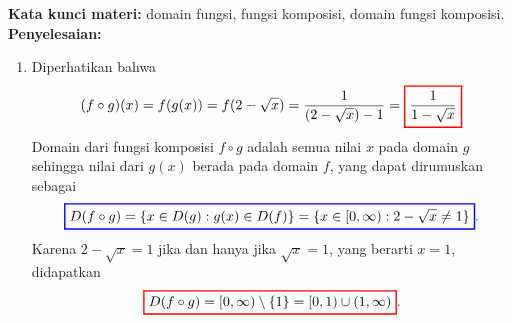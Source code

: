 \documentclass[10pt,openany,a4paper]{article}
\theoremstyle{definition}
\theoremstyle{definition}
\theoremstyle{plain}
\newenvironment{jawab}[2][tes]{%
\par\noindent\textbf{Kata kunci materi:} #1.\\
\textbf{Penyelesaian:} #2%
}{}
\begin{document}
\begin{enumerate}
\begin{jawab}[domain fungsi, fungsi komposisi, domain fungsi komposisi]
{\begin{enumerate}
            \[
            \colorlet{oldcolor}{.}
        \color{red}
        \setlength{\fboxrule}{1pt} \boxed{\color{oldcolor}D(f)=\{x \in \mathbb{R} : x \neq 1\}}\color{oldcolor}.
            \]
            Selanjutnya, diperhatikan bahwa $g(x)$ memuat akar kuadrat, sehingga domainnya adalah semua bilangan real yang membuat ekspresi di dalam akar kuadrat tak negatif. Jadi
            \[
            \colorlet{oldcolor}{.}
        \color{red}
        \setlength{\fboxrule}{1pt} \boxed{\color{oldcolor}D(g)=\{x \in \mathbb{R} : x \geq 0\}}\color{oldcolor}.
            \]
            \item Diperhatikan bahwa
            \begin{align*}
                (f\circ g)(x) = f(g(x)) = f(2 - \sqrt{x}) = \frac{1}{(2 - \sqrt{x}) - 1} =
                \colorlet{oldcolor}{.}
        \color{red}
        \setlength{\fboxrule}{1pt} \boxed{\color{oldcolor}\frac{1}{1 - \sqrt{x}}}\color{oldcolor}
            \end{align*}
            Domain dari fungsi komposisi $f\circ g$ adalah semua nilai $x$ pada domain $g$ sehingga nilai dari $g(x)$ berada pada domain $f$, yang dapat dirumuskan sebagai
            \begin{align*}
                \colorlet{oldcolor}{.}
        \color{blue}
        \setlength{\fboxrule}{1pt} \boxed{\color{oldcolor}D(f\circ g) = \{x \in D(g) : g(x) \in D(f)\} = \{x \in [0, \infty) : 2 - \sqrt{x} \neq 1\}}\color{oldcolor}.
            \end{align*}
            Karena $2 - \sqrt{x} = 1$ jika dan hanya jika $\sqrt{x} = 1$, yang berarti $x = 1$, didapatkan
            \begin{align*}
                \colorlet{oldcolor}{.}
        \color{red}
        \setlength{\fboxrule}{1pt} \boxed{\color{oldcolor}D(f\circ g) = [0, \infty) \setminus \{1\} = [0, 1) \cup (1, \infty)}\color{oldcolor}.
            \end{align*}
        \end{enumerate}
    }
    \end{jawab}


\end{enumerate}
\end{document}
